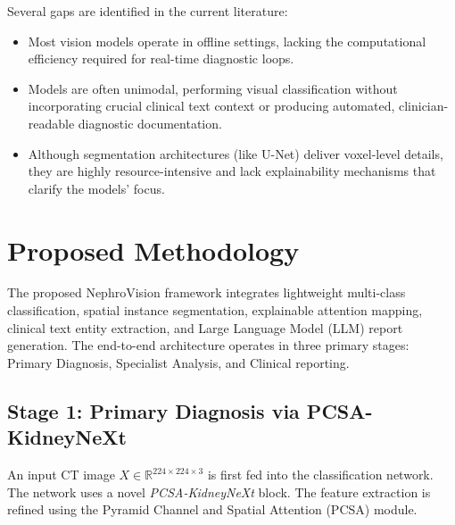 \documentclass[preprint,12pt]{elsarticle}
\begin{document}
Several gaps are identified in the current literature:
\begin{itemize}
    \item Most vision models operate in offline settings, lacking the computational efficiency required for real-time diagnostic loops.
    \item Models are often unimodal, performing visual classification without incorporating crucial clinical text context or producing automated, clinician-readable diagnostic documentation.
    \item Although segmentation architectures (like U-Net) deliver voxel-level details, they are highly resource-intensive and lack explainability mechanisms that clarify the models' focus.
\end{itemize}

\section{Proposed Methodology}
\label{sec:method}
The proposed NephroVision framework integrates lightweight multi-class classification, spatial instance segmentation, explainable attention mapping, clinical text entity extraction, and Large Language Model (LLM) report generation. The end-to-end architecture operates in three primary stages: Primary Diagnosis, Specialist Analysis, and Clinical reporting.

\subsection{Stage 1: Primary Diagnosis via PCSA-KidneyNeXt}
An input CT image $X \in \mathbb{R}^{224 \times 224 \times 3}$ is first fed into the classification network. The network uses a novel \textit{PCSA-KidneyNeXt} block. The feature extraction is refined using the Pyramid Channel and Spatial Attention (PCSA) module.
\end{document}
